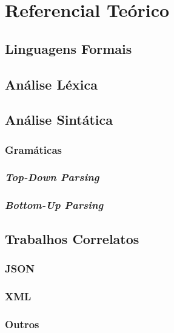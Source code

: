 \chapter[Referencial Teórico]{Referencial Teórico}

\section{Linguagens Formais}

\section{Análise Léxica}

\section{Análise Sintática}

\subsection{Gramáticas}

\subsection{\textit{Top-Down Parsing}}

\subsection{\textit{Bottom-Up Parsing}}

\section{Trabalhos Correlatos}

\subsection{JSON}

\subsection{XML}

\subsection{Outros}

